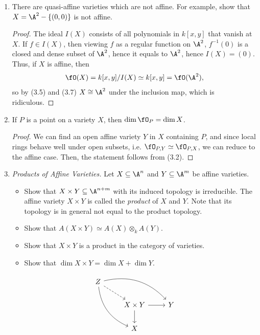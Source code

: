 \documentclass[a4paper]{article}
\begin{document}
\begin{enumerate} [label=\textbf{\arabic*.}, leftmargin=-0.05em]
\item[\textbf{6.}] There are quasi-affine varieties which are not affine. For example, show that $X = \A^2 - \{(0, 0) \}$ is not affine.

\begin{proof}
    The ideal $I(X)$ consists of all polynomials in $k[x, y]$ that vanish at $X$.
    If $f \in I(X)$, then viewing $f$ as a regular function on $\A^2$, $f^{-1}(0)$ is a closed and dense subset of $\A^2$, hence it equals to $\A^2$, hence $I(X) = (0)$.
    Thus, if $X$ is affine, then
    \begin{equation*}
        \fO(X) = k[x, y] / I(X) \simeq k[x, y] = \fO(\A^2),
    \end{equation*}
    so by (3.5) and (3.7) $X \cong \A^2$ under the inclusion map, which is ridiculous.
\end{proof}

\item[\textbf{12.}] If $P$ is a point on a variety $X$, then $\dim{\fO_P} = \dim{X}$.

\begin{proof}
    We can find an open affine variety $Y$ in $X$ containing $P$, and since local rings behave well under open subsets, i.e. $\fO_{P, Y} \simeq \fO_{P, X}$, we can reduce to the affine case.
    Then, the statement follows from (3.2).
\end{proof}

\item[\textbf{15.}] \textit{Products of Affine Varieties.} Let $X \subseteq \A^n$ and $Y \subseteq \A^m$ be affine varieties.
\begin{itemize}
    \item[(a)] Show that $X \times Y \subseteq \A^{n + m}$ with its induced topology is irreducible. The affine variety $X \times Y$ is called the \textit{product} of $X$ and $Y$. Note that its topology is in general not equal to the product topology.

    \item[(b)] Show that $A(X \times Y) \simeq A(X) \otimes_k A(Y)$.

    \item[(c)] Show that $X \times Y$ is a product in the category of varieties.

    \item[(d)] Show that $\dim{X \times Y} = \dim{X} + \dim{Y}$.
\end{itemize}
\[ \begin{tikzcd}
    Z \arrow[rdd, bend right] \arrow[rrd, bend left] \arrow[rd, dashed] &                                &   \\
                                                                        & X \times Y \arrow[d] \arrow[r] & Y \\
                                                                        & X                              &  
\end{tikzcd} \]


\end{enumerate}
\end{document}

